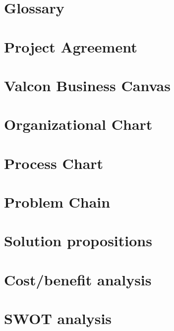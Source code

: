 \chapter{Glossary}

\chapter{Project Agreement}

\chapter{Valcon Business Canvas}


\label{app:it_strategy}

\chapter{Organizational Chart}

\chapter{Process Chart}

\chapter{Problem Chain}

\chapter{Solution propositions}

\chapter{Cost/benefit analysis}


\label{app:recruitment_data}
\chapter{SWOT analysis}

